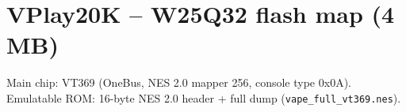 \documentclass{article}
\begin{document}
\pagestyle{empty}

\newcommand\bithead[2]{\bitbox[]{#1}{\scriptsize\bfseries #2}}

\newcommand{\memsection}[4]{
    \bytefieldsetup{bitheight=#3\baselineskip} %
    \bitbox[]{8}{
        \texttt{0x\uppercase{#2}} \\
        \vspace{#3\baselineskip} \vspace{-2\baselineskip} \vspace{-#3pt}
        \texttt{0x\uppercase{#1}}
    }
    \bitbox{16}{#4}
}

\section*{VPlay20K -- W25Q32 flash map (4 MB)}

Main chip: VT369 (OneBus, NES 2.0 mapper 256, console type 0x0A).
Emulatable ROM: 16-byte NES 2.0 header + full dump (\texttt{vape\_full\_vt369.nes}).
\end{document}
